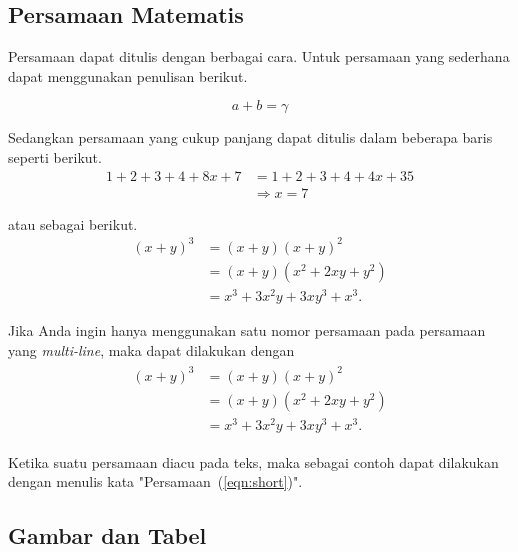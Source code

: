     \subsection{Persamaan Matematis}
    \label{subsec:pers_mat}
    
        Persamaan dapat ditulis dengan berbagai cara. Untuk persamaan yang sederhana dapat menggunakan penulisan berikut.
        
        \begin{equation}
            \label{eqn:short}
            a+b=\gamma
        \end{equation}
        
        \noindent Sedangkan persamaan yang cukup panjang dapat ditulis dalam beberapa baris seperti berikut.
        \begin{equation}
            \label{eqn:long1}
            \begin{split}
                1+2+3+4+8x+7 & =1+2+3+4+4x+35 \\
                & \Rightarrow x=7
            \end{split}
        \end{equation}
        
        \noindent atau sebagai berikut.
        \begin{align}
            \label{eqn:long2}
            (x+y)^3&=(x+y)(x+y)^2\\
                   &=(x+y)(x^2+2xy+y^2)\\
                   &=x^3+3x^2y+3xy^3+x^3.
        \end{align}
        
        Jika Anda ingin hanya menggunakan satu nomor persamaan pada persamaan yang \textit{multi-line}, maka dapat dilakukan dengan
        \begin{align}
            \label{eqn:long3}
            \begin{split}
                 (x+y)^3&=(x+y)(x+y)^2\\
                       &=(x+y)(x^2+2xy+y^2)\\
                       &=x^3+3x^2y+3xy^3+x^3.
            \end{split}
        \end{align}
        
        \noindent Ketika suatu persamaan diacu pada teks, maka sebagai contoh dapat dilakukan dengan menulis kata "Persamaan~(\ref{eqn:short})".
    
    \subsection{Gambar dan Tabel}
    \label{subsec:gmbr_tab}
        
